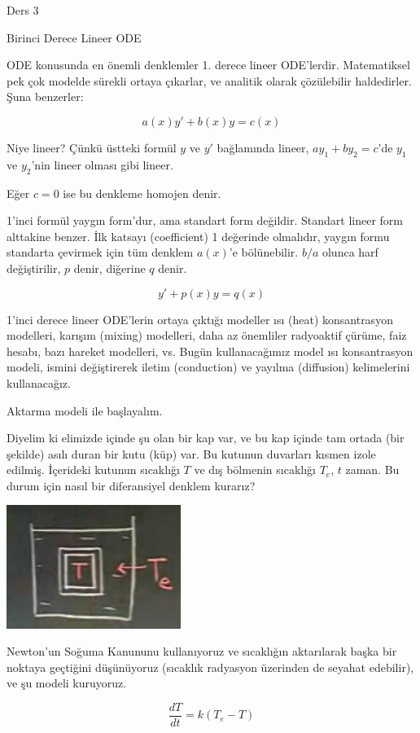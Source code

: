 \documentclass[12pt,fleqn]{article}\usepackage{../../common}
\begin{document}
Ders 3

Birinci Derece Lineer ODE

ODE konusunda en önemli denklemler 1. derece lineer
ODE'lerdir. Matematiksel pek çok modelde sürekli ortaya çıkarlar, ve
analitik olarak çözülebilir haldedirler. Şuna benzerler:

$$ a(x)y' + b(x)y = c(x) $$

Niye lineer? Çünkü üstteki formül $y$ ve $y'$ bağlamında lineer, 
$ay_1 + by_2 = c$'de $y_1$ ve $y_2$'nin lineer olması gibi lineer.

Eğer $c = 0$ ise bu denkleme homojen denir. 

1'inci formül yaygın form'dur, ama standart form değildir. Standart lineer
form alttakine benzer. İlk katsayı (coefficient) 1 değerinde olmalıdır,
yaygın formu standarta çevirmek için tüm denklem $a(x)$'e
bölünebilir. $b/a$ olunca harf değiştirilir, $p$ denir, diğerine $q$ denir.

$$ y' + p(x)y = q(x) $$

1'inci derece lineer ODE'lerin ortaya çıktığı modeller ısı (heat) konsantrasyon
modelleri, karışım (mixing) modelleri, daha az önemliler radyoaktif çürüme, faiz
hesabı, bazı hareket modelleri, vs. Bugün kullanacağımız model ısı konsantrasyon
modeli, ismini değiştirerek iletim (conduction) ve yayılma (diffusion)
kelimelerini kullanacağız.

Aktarma modeli ile başlayalım. 

Diyelim ki elimizde içinde şu olan bir kap var, ve bu kap içinde tam ortada
(bir şekilde) asılı duran bir kutu (küp) var. Bu kutunun duvarları kısmen
izole edilmiş. İçerideki kutunun sıcaklığı $T$ ve dış bölmenin sıcaklığı
$T_e$, $t$ zaman. Bu durum için nasıl bir diferansiyel denklem kurarız?

\includegraphics[height=4cm]{3_1.png}

Newton'un Soğuma Kanununu kullanıyoruz ve sıcaklığın aktarılarak başka bir
noktaya geçtiğini düşünüyoruz (sıcaklık radyasyon üzerinden de seyahat
edebilir), ve şu modeli kuruyoruz.

$$ \frac{dT}{dt} = k(T_e - T) $$
\end{document}
